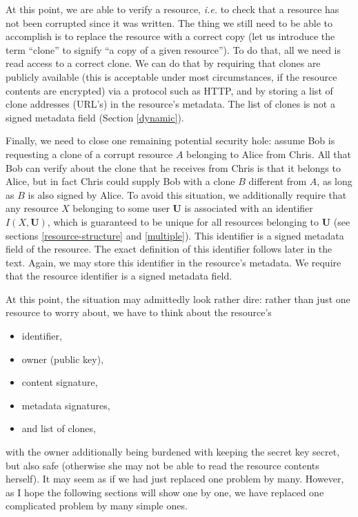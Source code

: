 \documentclass[11pt]{article}
\begin{document}
\begin{mainmatter}
At this point, we are able to verify a resource, \emph{i.e.} to check that a resource has not been corrupted since it was written. The thing we still need to be able to accomplish is to replace the resource with a correct copy (let us introduce the term ``clone'' to signify ``a copy of a given resource''). To do that, all we need is read access to a correct clone.  We can do that by requiring that clones are publicly available (this is acceptable under most circumstances, if the resource contents are encrypted) via a protocol such as HTTP, and by storing a list of clone addresses (URL's) in the resource's metadata. The list of clones is not a signed metadata field (Section \ref{dynamic}).

Finally, we need to close one remaining potential security hole: assume Bob is requesting a clone of a corrupt resource $A$ belonging to Alice from Chris. All that Bob can verify about the clone that he receives from Chris is that it belongs to Alice, but in fact Chris could supply Bob with a clone $B$ different from $A$, as long as $B$ is also signed by Alice. To avoid this situation, we additionally require that any resource $X$ belonging to some user $\mathbf U$ is associated with an identifier $I(X, \mathbf U)$, which is guaranteed to be unique for all resources belonging to $\mathbf U$ (see sections \ref{resource-structure} and \ref{multiple}). This identifier is a signed metadata field of the resource. The exact definition of this identifier follows later in the text. Again, we may store this identifier in the resource's metadata. We require that the resource identifier is a signed metadata field.

At this point, the situation may admittedly look rather dire: rather than just one resource to worry about, we have to think about the resource's 
\begin{itemize}
\item identifier, 
\item owner (public key), 
\item content signature,
\item metadata signatures,
\item and list of clones,
\end{itemize} 
with the owner additionally being burdened with keeping the secret key secret, but also safe (otherwise she may not be able to read the resource contents herself). It may seem as if we had just replaced one problem by many. However, as I hope the following sections will show one by one, we have replaced one complicated problem by many simple ones.


\end{mainmatter}
\end{document}
